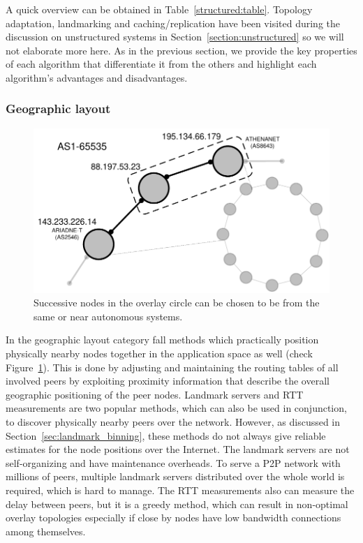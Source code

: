 A quick overview can be obtained in Table~\ref{structured:table}. Topology
adaptation, landmarking and caching/replication have been visited during the
discussion on unstructured systems in Section~\ref{section:unstructured} so
we will not elaborate more here. As in the previous section, we provide the 
key properties of each algorithm that differentiate it from the others and
highlight 
each algorithm's advantages and disadvantages.





\subsubsection{Geographic layout} \label{section:geographic_layout}

\begin{figure}[ht]
\centering
  \includegraphics[scale=0.4]{img/pdf/geographic-layout.pdf}
\caption{Successive nodes in the overlay circle can be chosen to be from the
same or near autonomous systems.}
\label{figure:geographic-layout}
\end{figure}

In the geographic layout category fall methods which practically
position physically nearby nodes together in the application space as well
(check Figure~\ref{figure:geographic-layout}). This is done by adjusting and
maintaining the routing tables of all involved peers by exploiting
proximity information that describe the overall geographic positioning of the
peer nodes. Landmark servers and RTT measurements are two popular methods, which
can also be used in conjunction, to discover physically nearby peers over the
network. However, as discussed in Section~\ref{sec:landmark_binning}, these
methods do not always give reliable estimates for the node positions over the
Internet. The landmark servers are not self-organizing and have maintenance
overheads. To serve a P2P network with millions of peers, multiple landmark
servers distributed over the whole world is required, which is hard to manage.
The RTT measurements also can measure the delay between peers, but it is a
greedy method, which can result in non-optimal overlay topologies especially if
close by nodes have low bandwidth connections among themselves.

